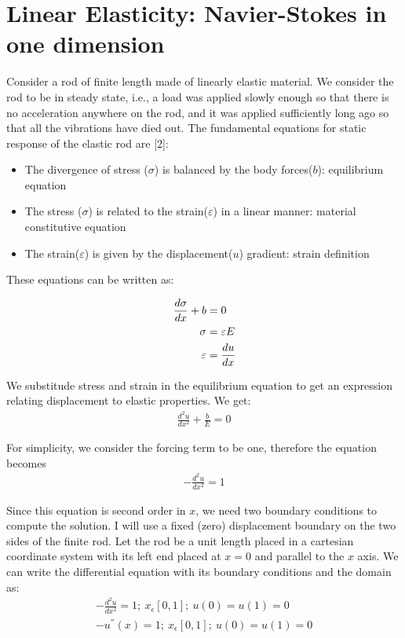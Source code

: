 \documentclass{article}
\begin{document}
\section{Linear Elasticity: Navier-Stokes in one dimension}
Consider a rod of finite length made of linearly elastic material. We consider the rod to be in steady state, i.e., a load was applied slowly enough so that there is no acceleration anywhere on the rod, and it was applied sufficiently long ago so that all the vibrations have died out. The fundamental equations for static response of the elastic rod are [2]:
\begin{itemize}
    \item The divergence of stress ($\sigma$) is balanced by the body forces($b$): equilibrium equation
    \item The stress ($\sigma$) is related to the strain($\varepsilon$) in a linear manner: material constitutive equation
    \item The strain($\varepsilon$) is given by the displacement($u$) gradient: strain definition
\end{itemize}

These equations can be written as:

\begin{align}
    \centering
    \frac{d\sigma}{dx} + b &= 0 \\
    \sigma &= \varepsilon E \\
    \varepsilon &= \frac{du}{dx} 
\end{align}

We substitude stress and strain in the equilibrium equation to get an expression relating displacement to elastic properties. We get:
\begin{align}
    \frac{d^2u}{dx^2} + \frac{b}{E} = 0
\end{align}

For simplicity, we consider the forcing term to be one, therefore the equation becomes 
\begin{align}
    -\frac{d^2u}{dx^2} = 1
\end{align}

Since this equation is second order in $x$, we need two boundary conditions to compute the solution. I will use a fixed (zero) displacement boundary on the two sides of the finite rod. Let the rod be a unit length placed in a cartesian coordinate system with its left end placed at $x = 0$ and parallel to the $x$ axis. We can write the differential equation with its boundary conditions and the domain as:
\begin{align}
    -\frac{d^2u}{dx^2} = 1;\ x_{\epsilon}[0,1];\ u(0) = u(1) = 0 \\
    -u^{''}(x) = 1; \ x_{\epsilon}[0,1];\ u(0) = u(1) = 0 
\end{align}
\end{document}
